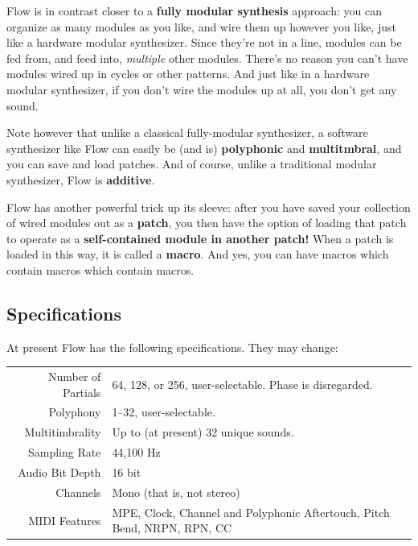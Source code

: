 \documentclass{article}
\newcommand\bump{\vspace{20in}}
\newcommand\name{Flow}
\begin{document}
{\name} is in contrast closer to a {\bf fully modular synthesis} approach: you can organize as many modules as you like, and wire them up however you like, just like a hardware modular synthesizer. Since they're not in a line, modules can be fed from, and feed into, {\it multiple} other modules.  There's no reason you can't have modules wired up in cycles or other patterns.  And just like in a hardware modular synthesizer, if you don't wire the modules up at all, you don't get any sound. 

Note however that unlike a classical fully-modular synthesizer, a software synthesizer like {\name} can easily be (and is) {\bf polyphonic} and {\bf multitmbral}, and you can save and load patches.  And of course, unlike a traditional modular synthesizer, {\name} is {\bf additive}.

{\name} has another powerful trick up its sleeve: after you have saved your collection of wired modules out as a {\bf patch}, you then have the option of loading that patch to operate as a {\bf self-contained module in another patch!}  When a patch is loaded in this way, it is called a {\bf macro}.  And yes, you can have macros which contain macros which contain macros.


\subsection{Specifications}

At present {\name} has the following specifications.  They may change:

\begin{center}
\begin{tabular}{rl}
Number of Partials&64, 128, or 256, user-selectable.  Phase is disregarded.\\
Polyphony&1--32, user-selectable.\\
Multitimbrality&Up to (at present) 32 unique sounds.\\
Sampling Rate&44,100 Hz\\
Audio Bit Depth&16 bit\\
Channels&Mono (that is, not stereo)\\
MIDI Features&MPE, Clock, Channel and Polyphonic Aftertouch, Pitch Bend, NRPN, RPN, CC\\
\end{tabular}
\end{center}


\bump
\end{document}

